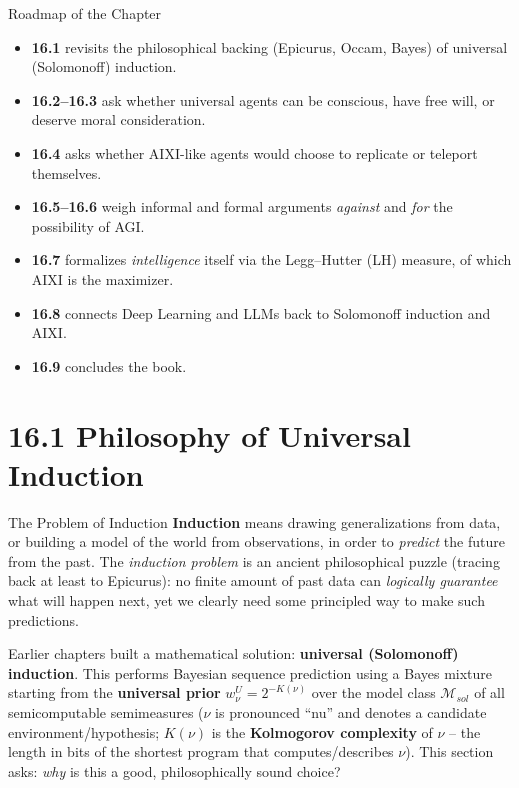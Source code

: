 \documentclass[aspectratio=169,10pt]{beamer}
\newcommand{\Mc}{\mathcal{M}}
\begin{document}
\begin{frame}{Roadmap of the Chapter}
  \begin{itemize}
    \item \textbf{16.1} revisits the philosophical backing (Epicurus, Occam,
      Bayes) of universal (Solomonoff) induction.
    \item \textbf{16.2--16.3} ask whether universal agents can be conscious,
      have free will, or deserve moral consideration.
    \item \textbf{16.4} asks whether AIXI-like agents would choose to
      replicate or teleport themselves.
    \item \textbf{16.5--16.6} weigh informal and formal arguments
      \emph{against} and \emph{for} the possibility of AGI.
    \item \textbf{16.7} formalizes \emph{intelligence} itself via the
      Legg--Hutter (LH) measure, of which AIXI is the maximizer.
    \item \textbf{16.8} connects Deep Learning and LLMs back to Solomonoff
      induction and AIXI.
    \item \textbf{16.9} concludes the book.
  \end{itemize}
\end{frame}

\section{16.1 Philosophy of Universal Induction}

\begin{frame}{The Problem of Induction}
  \textbf{Induction} means drawing generalizations from data, or building a
  model of the world from observations, in order to \emph{predict} the
  future from the past. The \emph{induction problem} is an ancient
  philosophical puzzle (tracing back at least to Epicurus): no finite amount
  of past data can \emph{logically guarantee} what will happen next, yet we
  clearly need some principled way to make such predictions.

  \vspace{0.4em}
  Earlier chapters built a mathematical solution: \textbf{universal
  (Solomonoff) induction}. This performs Bayesian sequence prediction using
  a Bayes mixture starting from the \textbf{universal prior}
  $w^U_\nu = 2^{-K(\nu)}$
  over the model class $\Mc_{sol}$ of all semicomputable semimeasures ($\nu$
  is pronounced ``nu'' and denotes a candidate environment/hypothesis;
  $K(\nu)$ is the \textbf{Kolmogorov complexity} of $\nu$ -- the length in
  bits of the shortest program that computes/describes $\nu$). This section
  asks: \emph{why} is this a good, philosophically sound choice?
\end{frame}
\end{document}
